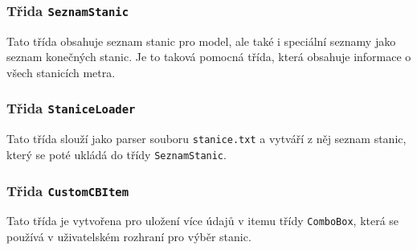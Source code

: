 \documentclass[12pt, a4paper]{article}
\begin{document}
\subsubsection{Třida \texttt{SeznamStanic}}
Tato třída obsahuje seznam stanic pro model, ale také i speciální seznamy jako seznam konečných stanic. Je to taková pomocná třída, která obsahuje informace o všech stanicích metra.

\subsubsection{Třida \texttt{StaniceLoader}}
Tato třída slouží jako parser souboru \texttt{stanice.txt} a vytváří z něj seznam stanic, který se poté ukládá do třídy \texttt{SeznamStanic}.
\subsubsection{Třida \texttt{CustomCBItem}}
Tato třída je vytvořena pro uložení více údajů v itemu třídy \texttt{ComboBox}, která se používá v uživatelském rozhraní pro výběr stanic.
\end{document}
